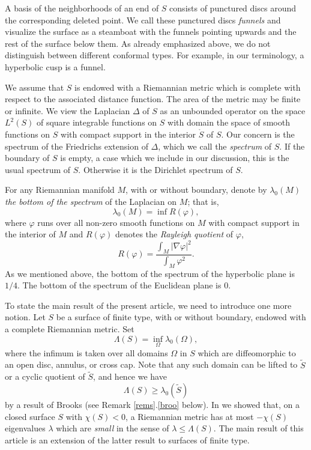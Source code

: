 A basis of the neighborhoods of an end of $S$
consists of punctured discs around the corresponding deleted point.
We call these punctured discs \emph{funnels} and visualize the surface as a steamboat
with the funnels pointing upwards and the rest of the surface below them.
As already emphasized above, we do not distinguish between different conformal types.
For example, in our terminology, a hyperbolic cusp is a funnel.

We assume that $S$ is endowed with a Riemannian metric
which is complete with respect to the associated distance function.
The area of the metric may be finite or infinite.
We view the Laplacian $\Delta$ of $S$ as an unbounded operator
on the space $L^2(S)$ of square integrable functions on $S$
with domain the space of smooth functions on $S$ with compact support
in the interior $\mathring S$ of $S$.
Our concern is the spectrum of the Friedrichs extension of $\Delta$,
which we call the \emph{spectrum} of $S$.
If the boundary of $S$ is empty, a case which we include in our discussion,
this is the usual spectrum of $S$.
Otherwise it is the Dirichlet spectrum of $S$.

For any Riemannian manifold $M$, with or without boundary, denote by $\lambda_0(M)$
\emph{the bottom of the spectrum} of the Laplacian on $M$; that is,
\begin{equation}\label{bottom}
  \lambda_0(M) = \inf R({\varphi}),
\end{equation}
where ${\varphi}$ runs over all non-zero smooth functions on $M$ with compact support
in the interior of $M$ and $R({\varphi})$ denotes the \emph{Rayleigh quotient} of ${\varphi}$, 
\begin{equation}\label{raydef}
  R({\varphi}) = \frac{\int_M |\nabla{\varphi}|^2}{\int_M{\varphi}^2}.
\end{equation}
As we mentioned above, the bottom of the spectrum of the hyperbolic plane is $1/4$.
The bottom of the spectrum of the Euclidean plane is $0$.

To state the main result of the present article,
we need to introduce one more notion.
Let $S$ be a surface of finite type, with or without boundary,
endowed with a complete Riemannian metric.
Set
\begin{equation}
  \Lambda(S) = \inf_\Omega \lambda_0(\Omega),
\end{equation}
where the infimum is taken over all domains $\Omega$ in $S$
which are diffeomorphic to an open disc, annulus, or cross cap.
Note that any such domain can be lifted to $\tilde S$ or a cyclic quotient of $\tilde S$,
and hence we have
\begin{equation}\label{bro}
  \Lambda(S) \ge \lambda_0(\tilde S)
\end{equation}
by a result of Brooks \cite[Theorem 1]{Br2} (see  Remark \ref{rems}.\ref{broo} below).
In \cite{BMM} we showed that, on a closed surface $S$ with $\chi(S)<0$,
a Riemannian metric has at most $-\chi(S)$ eigenvalues $\lambda$
which are \emph{small} in the sense of $\lambda\le\Lambda(S)$.
The main result of this article is an extension of the latter result
to surfaces of finite type.

